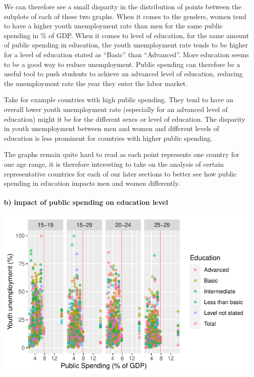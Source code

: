\documentclass[
  letterpaper,
  DIV=11,
  numbers=noendperiod]{scrartcl}
\let\oldparagraph\paragraph
\renewcommand{\paragraph}[1]{\oldparagraph{#1}\mbox{}}
\begin{document}
We can therefore see a small disparity in the distribution of points
between the subplots of each of these two graphs. When it comes to the
genders, women tend to have a higher youth unemployment rate than men
for the same public spending in \% of GDP. When it comes to level of
education, for the same amount of public spending in education, the
youth unemployment rate tends to be higher for a level of education
stated as ``Basic'' than ``Advanced''. More education seems to be a good
way to reduce unemployment. Public spending can therefore be a useful
tool to push students to achieve an advanced level of education,
reducing the unemployment rate the year they enter the labor market.

Take for example countries with high public spending. They tend to have
an overall lower youth unemployment rate (especially for an advanced
level of education) might it be for the different sexes or level of
education. The disparity in youth unemployment between men and women and
different levels of education is less prominent for countries with
higher public spending.

The graphs remain quite hard to read as each point represents one
country for one age range, it is therefore interesting to take on the
analysis of certain representative countries for each of our later
sections to better see how public spending in education impacts men and
women differently.

\hypertarget{b-impact-of-public-spending-on-education-level}{%
\paragraph{b) impact of public spending on education
level}\label{b-impact-of-public-spending-on-education-level}}

\includegraphics{Projet-BM_files/figure-pdf/unnamed-chunk-18-1.pdf}
\end{document}
